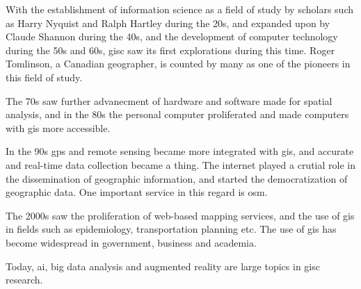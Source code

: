 With the establishment of information science as a field of study by scholars
such as Harry Nyquist and Ralph Hartley during the 20s, and expanded upon by
Claude Shannon during the 40s, and the development of computer technology during
the 50s and 60s, \acrshort{gisc} saw its first explorations during this time.
Roger Tomlinson, a Canadian geographer, is counted by many as one of the
pioneers in this field of study.

The 70s saw further advanecment of hardware and software made for spatial
analysis, and in the 80s the personal computer proliferated and made
computers with \acrshort{gis} more accessible.

In the 90s \acrshort{gps} and remote sensing became more integrated with
\acrshort{gis}, and accurate and real-time data collection became a thing.
The internet played a crutial role in the dissemination of geographic
information, and started the democratization of geographic data. One important
service in this regard is \acrshort{osm}.

The 2000s saw the proliferation of web-based mapping services, and the use of
\acrshort{gis} in fields such as epidemiology, transportation planning etc.
The use of \acrshort{gis} has become widespread in government, business and
academia.

Today, \acrlong{ai}, big data analysis and augmented reality are large topics in
\acrshort{gisc} research.





